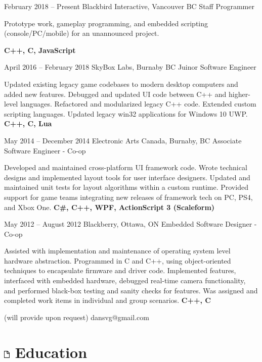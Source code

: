 \documentclass[10pt]{tccv}
\begin{document}
\begin{eventlist}

\item{February 2018 -- Present}
     {Blackbird Interactive, Vancouver BC}
     {Staff Programmer}
     
Prototype work, gameplay programming, and embedded scripting (console/PC/mobile) for an unannounced project.

 \textbf{C++, C, JavaScript}

\item{April 2016 -- February 2018}
     {SkyBox Labs, Burnaby BC}
     {Juinor Software Engineer}

Updated existing legacy game codebases to modern desktop computers and added new features. Debugged and updated UI code between C++ and higher-level languages. Refactored and modularized legacy C++ code. Extended custom scripting languages. Updated legacy win32 applications for Windows 10 UWP.  \textbf{C++, C, Lua}

\item{May 2014 -- December 2014}
     {Electronic Arts Canada, Burnaby, BC}
     {Associate Software Engineer - Co-op}

Developed and maintained cross-platform UI framework code. Wrote technical designs and implemented layout tools for user interface designers. Updated and maintained unit tests for layout algorithms within a custom runtime. Provided support for game teams integrating new releases of framework tech on PC, PS4, and Xbox One. \textbf{C\#, C++, WPF, ActionScript 3 (Scaleform)}

\item{May 2012 -- August 2012}
     {Blackberry, Ottawa, ON}
     {Embedded Software Designer - Co-op}

Assisted with implementation and maintenance of operating system level hardware abstraction. Programmed in C and C++, using object-oriented techniques to encapsulate firmware and driver code. Implemented features, interfaced with embedded hardware, debugged real-time camera functionality, and performed black-box testing and sanity checks for features. Was assigned and completed work items in individual and group scenarios. \textbf{C++, C}

\end{eventlist}

    {(will provide upon request)}
    {dansvg@gmail.com}

\section{\includegraphics[height=10pt, keepaspectratio=true]{file} Education}
\end{document}
